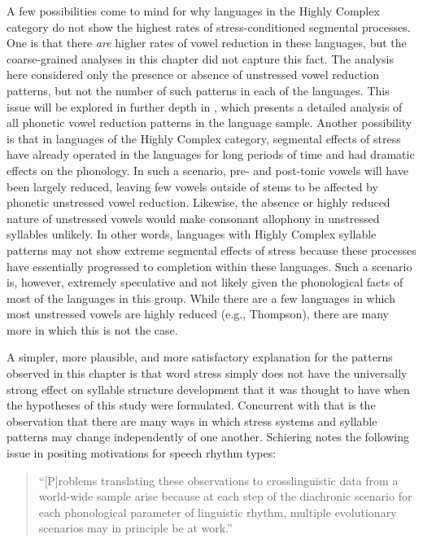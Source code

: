   A few possibilities come to mind for why languages in the Highly Complex category do not show the highest rates of stress-conditioned segmental processes. One is that there \textit{are} higher rates of vowel reduction in these languages, but the coarse-grained analyses in this chapter did not capture this fact. The analysis here considered only the presence or absence of unstressed vowel reduction patterns, but not the number of such patterns in each of the languages. This issue will be explored in further depth in , which presents a detailed analysis of all phonetic vowel reduction patterns in the language sample. Another possibility is that in languages of the Highly Complex category, segmental effects of stress have already operated in the languages for long periods of time and had dramatic effects on the phonology. In such a scenario, pre- and post-tonic vowels will have been largely reduced, leaving few vowels outside of stems to be affected by phonetic unstressed vowel reduction. Likewise, the absence or highly reduced nature of unstressed vowels would make consonant allophony in unstressed syllables unlikely. In other words, languages with Highly Complex syllable patterns may not show extreme segmental effects of stress because these processes have essentially progressed to completion within these languages. Such a scenario is, however, extremely speculative and not likely given the phonological facts of most of the languages in this group. While there are a few languages in which most unstressed vowels are highly reduced (e.g., Thompson), there are many more in which this is not the case.

  A simpler, more plausible, and more satisfactory explanation for the patterns observed in this chapter is that word stress simply does not have the universally strong effect on syllable structure development that it was thought to have when the hypotheses of this study were formulated. Concurrent with that is the observation that there are many ways in which stress systems and syllable patterns may change independently of one another. Schiering notes the following issue in positing motivations for speech rhythm types:

\begin{quote}
“[P]roblems translating these observations to crosslinguistic data from a world-wide sample arise because at each step of the diachronic scenario for each phonological parameter of linguistic rhythm, multiple evolutionary scenarios may in principle be at work.” 
\citep[353]{Schiering2007}
\end{quote}

